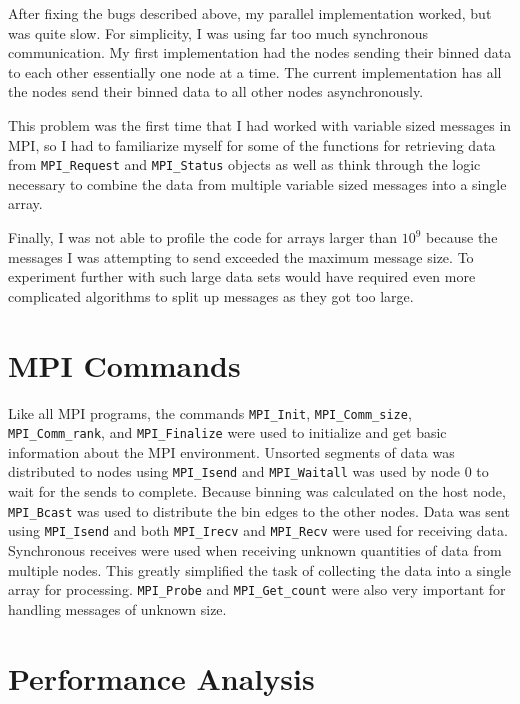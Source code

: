 \documentclass{article}
\begin{document}
After fixing the bugs described above, my parallel implementation worked, but was quite slow. For simplicity, I was using far too much synchronous communication. My first implementation had the nodes sending their binned data to each other essentially one node at a time. The current implementation has all the nodes send their binned data to all other nodes asynchronously.

This problem was the first time that I had worked with variable sized messages in MPI, so I had to familiarize myself for some of the functions for retrieving data from \verb!MPI_Request! and \verb!MPI_Status! objects as well as think through the logic necessary to combine the data from multiple variable sized messages into a single array. 

Finally, I was not able to profile the code for arrays larger than \(10^9\) because the messages I was attempting to send exceeded the maximum message size. To experiment further with such large data sets would have required even more complicated algorithms to split up messages as they got too large. 

\section{MPI Commands}
Like all MPI programs, the commands \verb!MPI_Init!, \verb!MPI_Comm_size!, \verb!MPI_Comm_rank!, and \verb!MPI_Finalize! were used to initialize and get basic information about the MPI environment. Unsorted segments of data was distributed to nodes using \verb!MPI_Isend! and \verb!MPI_Waitall! was used by node 0 to wait for the sends to complete. Because binning was calculated on the host node, \verb!MPI_Bcast! was used to distribute the bin edges to the other nodes. Data was sent using \verb!MPI_Isend! and both \verb!MPI_Irecv! and \verb!MPI_Recv! were used for receiving data. Synchronous receives were used when receiving unknown quantities of data from multiple nodes. This greatly simplified the task of collecting the data into a single array for processing. \verb!MPI_Probe! and \verb!MPI_Get_count! were also very important for handling messages of unknown size.

\section{Performance Analysis}
\end{document}
